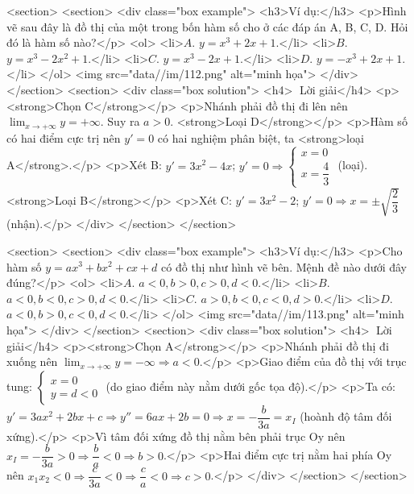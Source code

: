     <section>
        <section>
            <div class="box example">
                <h3>Ví dụ:</h3>
                <p>Hình vẽ sau đây là đồ thị của một trong bốn hàm số cho ở các đáp án A, B, C, D. Hỏi đó là hàm số nào?</p>
                <ol>
                    <li>\(A.\) \(y = x^3 + 2x + 1\).</li>
                    <li>\(B.\) \(y = x^3 - 2x^2 + 1\).</li>
                    <li>\(C.\) \(y = x^3 - 2x + 1\).</li>
                    <li>\(D.\) \(y = -x^3 + 2x + 1\).</li>
                </ol>
                <img src="data//im/112.png" alt="minh họa">
            </div>
        </section>
        <section>
            <div class="box solution">
                <h4>📝 Lời giải</h4>
                <p><strong>Chọn C</strong></p>
                <p>Nhánh phải đồ thị đi lên nên \(\lim_{x \to +\infty} y = +\infty\). Suy ra \(a>0\). <strong>Loại D</strong></p>
                <p>Hàm số có hai điểm cực trị nên \(y' = 0\) có hai nghiệm phân biệt, ta <strong>loại A</strong>.</p>
                <p>Xét B: \(y' = 3x^2 - 4x\); \(y' = 0 \Rightarrow \begin{cases} x = 0 \\ x = \dfrac{4}{3} \end{cases}\) (loại). <strong>Loại B</strong></p>
                <p>Xét C: \(y' = 3x^2 - 2\); \(y' = 0 \Rightarrow x = \pm \sqrt{\dfrac{2}{3}}\) (nhận).</p>
            </div>
        </section>
    </section>

    <section>
        <section>
            <div class="box example">
                <h3>Ví dụ:</h3>
                <p>Cho hàm số \(y = ax^3 + bx^2 + cx + d\) có đồ thị như hình vẽ bên. Mệnh đề nào dưới đây đúng?</p>
                <ol>
                    <li>\(A.\) \(a < 0, b > 0, c > 0, d < 0\).</li>
                    <li>\(B.\) \(a < 0, b < 0, c > 0, d < 0\).</li>
                    <li>\(C.\) \(a > 0, b < 0, c < 0, d > 0\).</li>
                    <li>\(D.\) \(a < 0, b > 0, c < 0, d < 0\).</li>
                </ol>
                <img src="data//im/113.png" alt="minh họa">
            </div>
        </section>
        <section>
            <div class="box solution">
                <h4>📝 Lời giải</h4>
                <p><strong>Chọn A</strong></p>
                <p>Nhánh phải đồ thị đi xuống nên \(\lim_{x \to +\infty} y = -\infty \Rightarrow \boxed{a < 0}\).</p>
                <p>Giao điểm của đồ thị với trục tung: \(\begin{cases} x = 0 \\ y = d < 0 \end{cases}\) (do giao điểm này nằm dưới gốc tọa độ).</p>
                <p>Ta có: \(y' = 3ax^2 + 2bx + c \Rightarrow y'' = 6ax + 2b = 0 \Rightarrow x = -\dfrac{b}{3a} = x_I\) (hoành độ tâm đối xứng).</p>
                <p>Vì tâm đối xứng đồ thị nằm bên phải trục Oy nên \(x_I = -\dfrac{b}{3a} > 0 \Rightarrow \dfrac{b}{a} < 0 \Rightarrow \boxed{b > 0}\).</p>
                <p>Hai điểm cực trị nằm hai phía Oy nên \(x_1x_2 < 0 \Rightarrow \dfrac{c}{3a} < 0 \Rightarrow \dfrac{c}{a} < 0 \Rightarrow \boxed{c > 0}\).</p>
            </div>
        </section>
    </section>


